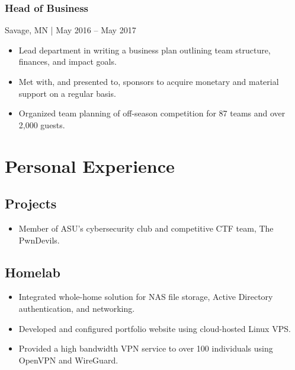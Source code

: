 \documentclass{article}
\begin{document}
\subsubsection{Head of Business}
Savage, MN | May 2016 – May 2017
\begin{itemize}[leftmargin=*]
\item Lead department in writing a business plan outlining team structure, finances, and impact goals.
\item Met with, and presented to, sponsors to acquire monetary and material support on a regular basis.
\item Organized team planning of off-season competition for 87 teams and over 2,000 guests.
\end{itemize}

\section{Personal Experience}
\subsection{Projects}
\begin{itemize}[leftmargin=*]
\item Member of ASU’s cybersecurity club and competitive CTF team, The PwnDevils.
\end{itemize}
\subsection{Homelab}
\begin{itemize}[leftmargin=*]
\item Integrated whole-home solution for NAS file storage, Active Directory authentication, and networking.
\item Developed and configured portfolio website using cloud-hosted Linux VPS.
\item Provided a high bandwidth VPN service to over 100 individuals using OpenVPN and WireGuard.
\end{itemize}
\end{document}

